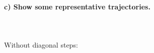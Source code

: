 \newpage
\paragraph{c) Show some representative trajectories.} \ \\
\\
    Without diagonal steps:
    \begin{figure}[h!]
        \centering
        \begin{minipage}{.5\linewidth}
          \centering
        \end{minipage}%
        \begin{minipage}{.5\linewidth}
          \centering
          \subfloat[self-avoiding random walk ($n=30$)]{
            \label{:b}
}
\end{minipage}
\end{figure}
